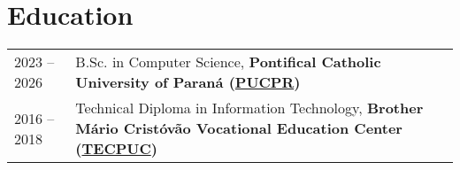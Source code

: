 \documentclass[a4paper,12pt]{article}
\begin{document}


    \section{Education}
    \begin{tabularx}{\linewidth}{@{}l X@{}}
        2023 -- 2026 & B.Sc. in Computer Science, \textbf{Pontifical Catholic University of Paraná (\href{https://www.pucpr.br}{PUCPR})} \\
        2016 -- 2018 & Technical Diploma in Information Technology, \textbf{Brother Mário Cristóvão Vocational Education Center (\href{http://www.tecpuc.com.br}{TECPUC})} \\
    \end{tabularx}




    \vfill
\end{document}
